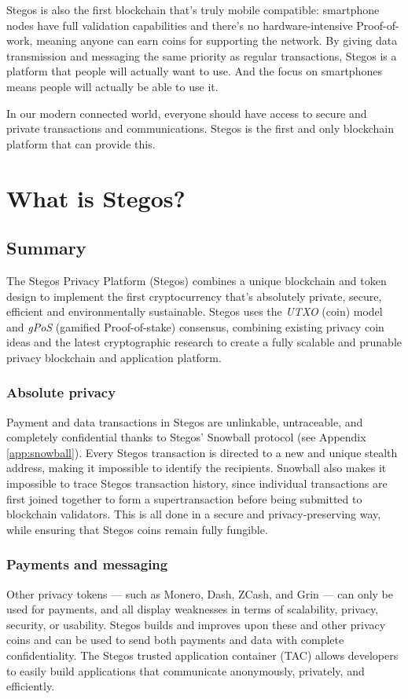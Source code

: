 \documentclass[8pt,fleqn,openany]{book}
\begin{document}
	Stegos is also the first blockchain that's truly mobile compatible: smartphone nodes have full validation capabilities and there's no hardware-intensive Proof-of-work, meaning anyone can earn coins for supporting the network. By giving data transmission and messaging the same priority as regular transactions, Stegos is a platform that people will actually want to use. And the focus on smartphones means people will actually be able to use it.
	
	In our modern connected world, everyone should have access to secure and private transactions and communications. Stegos is the first and only blockchain platform that can provide this.  
	
	\chapter{What is Stegos?}\label{chap:what-is-stegos}
	
	\section{Summary}
	The Stegos Privacy Platform (Stegos) combines a unique blockchain and token design to implement the first cryptocurrency that’s absolutely private, secure, efficient and environmentally sustainable. Stegos uses the \textit{UTXO} (coin) model and \textit{gPoS} (gamified Proof-of-stake) consensus, combining existing privacy coin ideas and the latest cryptographic research to create a fully scalable and prunable privacy blockchain and application platform. 
	
	\subsection{Absolute privacy}
	Payment and data transactions in Stegos are unlinkable, untraceable, and completely confidential thanks to Stegos' Snowball protocol (see Appendix \ref{app:snowball}). Every Stegos transaction is directed to a new and unique stealth address, making it impossible to identify the recipients. Snowball also makes it impossible to trace Stegos transaction history, since individual transactions are first joined together to form a supertransaction before being submitted to blockchain validators. This is all done in a secure and privacy-preserving way, while ensuring that Stegos coins remain fully fungible.
	
	\subsection{Payments and messaging}
	Other privacy tokens — such as Monero, Dash, ZCash, and Grin — can only be used for payments, and all display weaknesses in terms of scalability, privacy, security, or usability. Stegos builds and improves upon these and other privacy coins and can be used to send both payments and data with complete confidentiality. The Stegos trusted application container (TAC) allows developers to easily build applications that communicate anonymously, privately, and efficiently.
	
\end{document}
